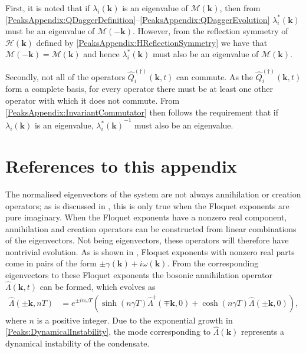First, it is noted that if $\lambda_i(\bm{k})$ is an eigenvalue of $\mathcal{M}(\bm{k})$, then from \eqref{PeaksAppendix:QDaggerDefinition}--\eqref{PeaksAppendix:QDaggerEvolution} $\lambda_i^*(\bm{k})$ must be an eigenvalue of $\mathcal{M}(-\bm{k})$. However, from the reflection symmetry of $\mathcal{H}(\bm{k})$ defined by \eqref{PeaksAppendix:HReflectionSymmetry} we have that $\mathcal{M}(-\bm{k}) = \mathcal{M}(\bm{k})$ and hence $\lambda_i^*(\bm{k})$ must also be an eigenvalue of $\mathcal{M}(\bm{k})$.

Secondly, not all of the operators $\hat{Q}_i^{(\dagger)}(\bm{k}, t)$ can commute. As the $\hat{Q}_i^{(\dagger)}(\bm{k}, t)$ form a complete basis, for every operator there must be at least one other operator with which it does not commute. From \eqref{PeaksAppendix:InvariantCommutator} then follows the requirement that if $\lambda_i(\bm{k})$ is an eigenvalue,   ${\lambda_i^*(\bm{k})}^{-1}$ must also be an eigenvalue.



\section{References to this appendix}

The normalised eigenvectors of the system are not always annihilation or creation operators; as is discussed in , this is only true when the Floquet exponents are pure imaginary. When the Floquet exponents have a nonzero real component, annihilation and creation operators can be constructed from linear combinations of the eigenvectors. Not being eigenvectors, these operators will therefore have nontrivial evolution. As is shown in , Floquet exponents with nonzero real parts come in pairs of the form $\pm \gamma(\bm{k}) + i \omega(\bm{k})$. From the corresponding eigenvectors to these Floquet exponents the bosonic annihilation operator $\hat{\Lambda}(\bm{k}, t)$ can be formed, which evolves as
\begin{align}
    \label{Peaks:DynamicalInstability}
    \hat{\Lambda}(\pm\bm{k}, nT) &= e^{\pm i n\omega T} \left( \sinh(n\gamma T) \hat{\Lambda}^\dagger(\mp\bm{k}, 0) + \cosh(n\gamma T) \hat{\Lambda}(\pm\bm{k}, 0)\right),
\end{align}
where $n$ is a positive integer. Due to the exponential growth in \eqref{Peaks:DynamicalInstability}, the mode corresponding to $\hat{\Lambda}(\bm{k})$ represents a dynamical instability of the condensate.
